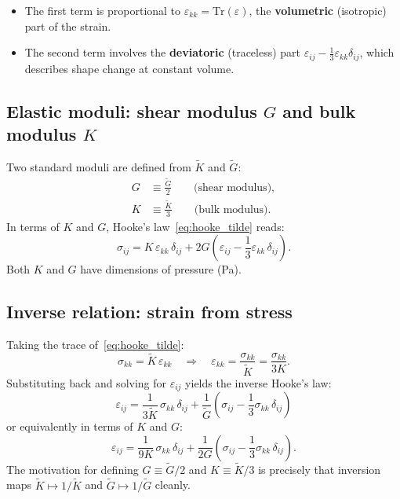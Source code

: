 \begin{itemize}
    \item The first term is proportional to $\varepsilon_{kk}=\mathrm{Tr}(\varepsilon)$, the \textbf{volumetric} (isotropic) part of the strain.
    \item The second term involves the \textbf{deviatoric} (traceless) part $\varepsilon_{ij}-\tfrac{1}{3}\varepsilon_{kk}\delta_{ij}$, which describes shape change at constant volume.
\end{itemize}

\subsection*{Elastic moduli: shear modulus $G$ and bulk modulus $K$}

Two standard moduli are defined from $\tilde{K}$ and $\tilde{G}$:
\begin{align}
    G &\equiv \frac{\tilde{G}}{2} \qquad \text{(shear modulus)}, \label{eq:G_def}\\[4pt]
    K &\equiv \frac{\tilde{K}}{3} \qquad \text{(bulk modulus)}. \label{eq:K_def}
\end{align}
In terms of $K$ and $G$, Hooke's law~\eqref{eq:hooke_tilde} reads:
\begin{equation}
    \sigma_{ij} = K\,\varepsilon_{kk}\,\delta_{ij} + 2G\!\left(\varepsilon_{ij} - \frac{1}{3}\varepsilon_{kk}\,\delta_{ij}\right).
    \label{eq:hooke_KG}
\end{equation}
Both $K$ and $G$ have dimensions of pressure (Pa).

\subsection*{Inverse relation: strain from stress}

Taking the trace of~\eqref{eq:hooke_tilde}:
\[
    \sigma_{kk} = \tilde{K}\,\varepsilon_{kk} \quad \Longrightarrow \quad \varepsilon_{kk} = \frac{\sigma_{kk}}{\tilde{K}} = \frac{\sigma_{kk}}{3K}.
\]
Substituting back and solving for $\varepsilon_{ij}$ yields the inverse Hooke's law:
\begin{equation}
    \boxed{\varepsilon_{ij} = \frac{1}{3\tilde{K}}\,\sigma_{kk}\,\delta_{ij} + \frac{1}{\tilde{G}}\!\left(\sigma_{ij} - \frac{1}{3}\sigma_{kk}\,\delta_{ij}\right)}
    \label{eq:hooke_inv_tilde}
\end{equation}
or equivalently in terms of $K$ and $G$:
\begin{equation}
    \boxed{\varepsilon_{ij} = \frac{1}{9K}\,\sigma_{kk}\,\delta_{ij} + \frac{1}{2G}\!\left(\sigma_{ij} - \frac{1}{3}\sigma_{kk}\,\delta_{ij}\right).}
    \label{eq:hooke_inv}
\end{equation}
The motivation for defining $G\equiv\tilde{G}/2$ and $K\equiv\tilde{K}/3$ is precisely that inversion maps $\tilde{K}\mapsto 1/\tilde{K}$ and $\tilde{G}\mapsto 1/\tilde{G}$ cleanly.

